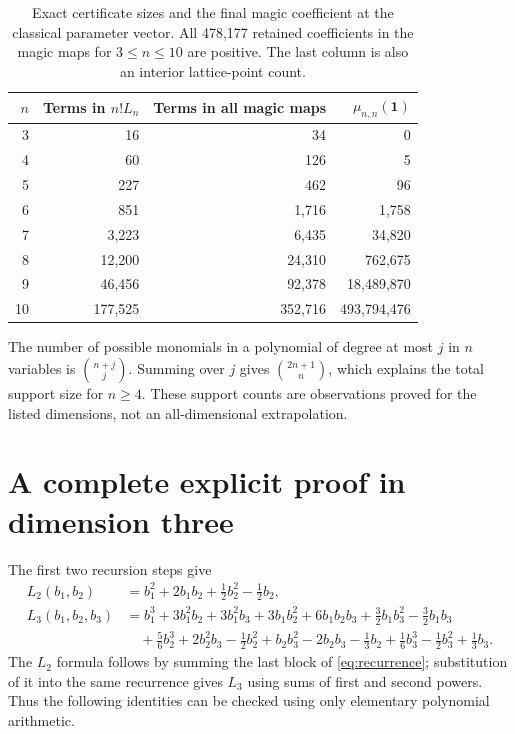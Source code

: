 \documentclass[11pt]{article}
\theoremstyle{definition}
\newcommand{\one}{\mathbf 1}
\numberwithin{equation}{section}
\begin{document}
\begin{table}[htbp]
\centering
\begin{tabular}{@{}rrrr@{}}
\toprule
$n$ & Terms in $n!L_n$ & Terms in all magic maps & $\mu_{n,n}(\one)$\\
\midrule
3 & 16 & 34 & 0 \\
4 & 60 & 126 & 5 \\
5 & 227 & 462 & 96 \\
6 & 851 & 1,716 & 1,758 \\
7 & 3,223 & 6,435 & 34,820 \\
8 & 12,200 & 24,310 & 762,675 \\
9 & 46,456 & 92,378 & 18,489,870 \\
10 & 177,525 & 352,716 & 493,794,476 \\
\bottomrule
\end{tabular}
\caption{Exact certificate sizes and the final magic coefficient at the
classical parameter vector. All 478,177 retained coefficients in the magic
maps for $3\le n\le10$ are positive. The last column is also an interior
lattice-point count.}
\label{tab:certificate-counts}
\end{table}

The number of possible monomials in a polynomial of degree at most $j$ in
$n$ variables is $\binom{n+j}{j}$. Summing over $j$ gives
$\binom{2n+1}{n}$, which explains the total support size for $n\ge4$.
These support counts are observations proved for the listed dimensions,
not an all-dimensional extrapolation.

\section{A complete explicit proof in dimension three}
\label{sec:cubic}

The first two recursion steps give
\begin{align*}
 L_2(b_1,b_2)&=b_1^2+2b_1b_2+\tfrac12b_2^2-\tfrac12b_2,\\
 L_3(b_1,b_2,b_3)&=b_1^3+3b_1^2b_2+3b_1^2b_3
 +3b_1b_2^2+6b_1b_2b_3+\tfrac32b_1b_3^2-\tfrac32b_1b_3\\
 &\quad+\tfrac56b_2^3+2b_2^2b_3-\tfrac12b_2^2
 +b_2b_3^2-2b_2b_3-\tfrac13b_2
 +\tfrac16b_3^3-\tfrac12b_3^2+\tfrac13b_3.
\end{align*}
The $L_2$ formula follows by summing the last block of
\eqref{eq:recurrence}; substitution of it into the same recurrence gives
$L_3$ using sums of first and second powers. Thus the following identities
can be checked using only elementary polynomial arithmetic.
\end{document}
